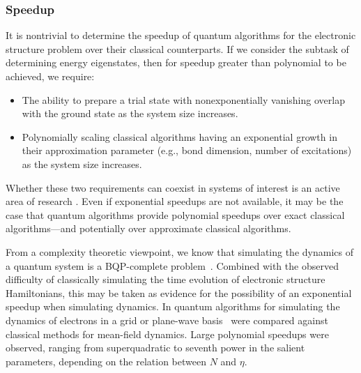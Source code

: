 \begin{refsection}
\subsubsection*{Speedup}
It is nontrivial to determine the speedup of quantum algorithms for the electronic structure problem over their classical counterparts. If we consider the subtask of determining energy eigenstates, then for speedup greater than polynomial to be achieved, we require:
\begin{itemize}
    \item The ability to prepare a trial state with nonexponentially vanishing overlap with the ground state as the system size increases.
    \item Polynomially scaling classical algorithms having an exponential growth in their approximation parameter (e.g., bond dimension, number of excitations) as the system size increases.
\end{itemize}
Whether these two requirements can coexist in systems of interest is an active area of research \cite{lee2022isThereEvidenceChemistry}. Even if exponential speedups are not available, it may be the case that quantum algorithms provide polynomial speedups over exact classical algorithms---and potentially over approximate classical algorithms.

From a complexity theoretic viewpoint, we know that simulating the dynamics of a quantum system is a BQP-complete problem~\cite{lloyd1996UnivQSim}. Combined with the observed difficulty of classically simulating the time evolution of electronic structure Hamiltonians, this may be taken as evidence for the possibility of an exponential speedup when simulating dynamics. In \cite{Babbush2023Dynamics} quantum algorithms for simulating the dynamics of electrons in a grid or plane-wave basis~\cite{kassal2008QuantumSimChemicalDynamics,babbush2019FirstQuantizedSublinear,su2021FaultTolerantChemistryFirstQuantized} were compared against classical methods for mean-field dynamics. Large polynomial speedups were observed, ranging from superquadratic to seventh power in the salient parameters, depending on the relation between $N$ and $\eta$.





\end{refsection}
